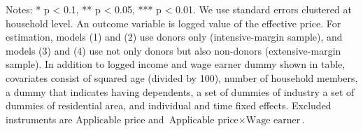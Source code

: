 \begin{table}
\begin{threeparttable}
\begin{tablenotes}
\item Notes: * p < 0.1, ** p < 0.05, *** p < 0.01. We use standard errors clustered at household level. An outcome variable is logged value of the effective price. For estimation, models (1) and (2) use donors only (intensive-margin sample), and models (3) and (4) use not only donors but also non-donors (extensive-margin sample). In addition to logged income and wage earner dummy shown in table, covariates consist of squared age (divided by 100), number of household members, a dummy that indicates having dependents, a set of dummies of industry a set of dummies of residential area, and individual and time fixed effects. Excluded instruments are $\text{Applicable price}$ and $\text{Applicable price}\times\text{Wage earner}$.
\end{tablenotes}
\end{threeparttable}
\end{table}
